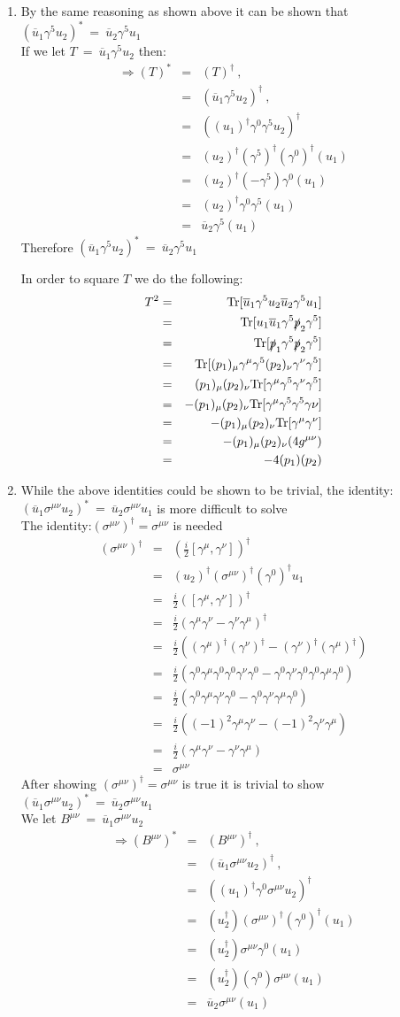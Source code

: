 \documentclass[12pt]{article}
\def \bea{\begin{eqnarray}}
\def \eea{\end{eqnarray}}
\def \Tr{{\rm Tr}}
\def \nn{\nonumber}
\def \nl{\nn \\}
\def \ou{\overline{u}}
\def \ga{\gamma}
\def \si{\sigma}
\begin{document}
\begin{enumerate}
\item By the same reasoning as shown above it can be shown that $(\ou_1 \ga^5 u_2)^* ~=~ \ou_2 \ga^5 u_1$ \nl
If we let $T ~=~ \ou_1\ga^5 u_2$ then:
\bea
\Rightarrow (T)^* &=& (T)^\dag ~,~~ \\\nonumber
&=& (\ou_1\ga^5 u_2)^\dag ~,~~ \nl\nonumber
&=& ((u_1)^\dag\ga^0\ga^5 u_2)^\dag \nl\nonumber
&=& (u_2)^\dag(\ga^5)^\dag (\ga^0)^\dag(u_1)\nl\nonumber
&=& (u_2)^\dag(-\ga^5) \ga^0(u_1)\nl\nonumber
&=& (u_2)^\dag \ga^0\ga^5(u_1)\nl
&=& \ou_2\ga^5(u_1)
\eea
Therefore  $(\ou_1 \ga^5 u_2)^* ~=~ \ou_2 \ga^5 u_1$

In order to square $T$ we do the following:
\bea
T^2&=& \Tr[\ou_1 \ga^5 u_2\ou_2 \ga^5 u_1] \\ \nonumber
&=& \Tr[u_1 \ou_1 \ga^5 \slashed{p}_2 \ga^5] \nl\nonumber
&=& \Tr[\slashed{p}_1 \ga^5 \slashed{p}_2 \ga^5] \nl\nonumber
&=& \Tr[(p_1)_\mu \ga^\mu \ga^5 (p_2)_\nu \ga^\nu \ga^5] \nl\nonumber
&=& (p_1)_\mu(p_2)_\nu \Tr[\ga^\mu\ga^5\ga^\nu\ga^5] \nl\nonumber
&=& -(p_1)_\mu(p_2)_\nu \Tr[\ga^\mu\ga^5\ga^5\ga\nu]\nl\nonumber
&=& -(p_1)_\mu(p_2)_\nu \Tr[\ga^\mu\ga^\nu]\nl\nonumber
&=& -(p_1)_\mu(p_2)_\nu (4g^{\mu\nu})\nl\nonumber
&=& -4(p_1)(p_2) \nl
\eea

\item While the above identities could be shown to be trivial, the identity: $(\ou_1 \si^{\mu\nu} u_2)^* ~=~\ou_2 \si^{\mu\nu} u_1$ is more difficult to solve \nl
The identity:$(\si^{\mu\nu})^\dag =\si^{\mu\nu}$ is needed
\bea
(\si^{\mu\nu})^\dag &=& (\frac{i}{2}[\ga^\mu,\ga^\nu])^\dag \\\nonumber
&=&(u_2)^\dag (\si^{\mu\nu})^\dag (\ga^0)^\dag u_1 \nl \nonumber
&=& \frac{i}{2}([\ga^\mu,\ga^\nu])^\dag\nl
&=& \frac{i}{2}(\ga^\mu\ga^\nu-\ga^\nu\ga^\mu)^\dag \nl\nonumber
&=& \frac{i}{2}((\ga^\mu)^\dag(\ga^\nu)^\dag-(\ga^\nu)^\dag(\ga^\mu)^\dag) \nl\nonumber
&=& \frac{i}{2}(\ga^0\ga^\mu\ga^0\ga^0\ga^\nu\ga^0-\ga^0\ga^\nu\ga^0\ga^0\ga^\mu\ga^0)\nl\nonumber
&=& \frac{i}{2}(\ga^0\ga^\mu\ga^\nu\ga^0-\ga^0\ga^\nu \ga^\mu\ga^0)\nl\nonumber
&=& \frac{i}{2}((-1)^2\ga^\mu\ga^\nu-(-1)^2\ga^\nu \ga^\mu) \nl\nonumber
&=& \frac{i}{2}(\ga^\mu\ga^\nu-\ga^\nu \ga^\mu)\nl
&=& \si^{\mu\nu}
\eea
After showing $(\si^{\mu\nu})^\dag =\si^{\mu\nu}$ is true it is trivial to show $(\ou_1 \si^{\mu\nu} u_2)^* ~=~\ou_2 \si^{\mu\nu} u_1$ \nl
We let $B^{\mu\nu} ~=~ \ou_1 \si^{\mu\nu} u_2$
\bea
\Rightarrow (B^{\mu\nu})^* &=& (B^{\mu\nu})^\dag ~,~~ \\\nonumber
&=& (\ou_1 \si^{\mu\nu} u_2)^\dag ~,~~ \nl\nonumber
&=& ((u_1)^\dag \ga^0 \si^{\mu\nu} u_2)^\dag \nl\nonumber
&=& (u_2^\dag)(\si^{\mu\nu})^\dag (\ga^0)^\dag(u_1)\nl\nonumber
&=& (u_2^\dag)\si^{\mu\nu}\ga^0(u_1)\nl\nonumber
&=& (u_2^\dag)(\ga^0)\si^{\mu\nu}(u_1)\nl
&=& \ou_2 \si^{\mu\nu}(u_1)
\eea


\end{enumerate}
\end{document}
